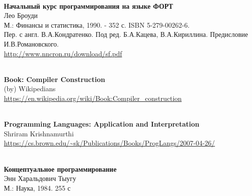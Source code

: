 \begin{thebibliography}{99}
\clearpage
{}\ \\
\textbf{Начальный курс программирования на языке ФОРТ}\\
Лео Броуди \\
М.: Финансы и статистика, 1990. - 352 с.  ISBN 5-279-00262-6.\\
Пер. с англ. В.А.Кондратенко. Под ред. Б.А.Кацева, В.А.Кириллина. Предисловие
И.В.Романовского.\\
\url{http://www.nncron.ru/download/sf.pdf}

\clearpage
{}\ \\
\textbf{Book: Compiler Construction}\\
(by) Wikipedians\\
\url{https://en.wikipedia.org/wiki/Book:Compiler_construction}

\clearpage
{}\ \\
\textbf{Programming Languages: Application and Interpretation}\\
Shriram Krishnamurthi\\
\url{https://cs.brown.edu/~sk/Publications/Books/ProgLangs/2007-04-26/}

\clearpage
{}\ \\
\textbf{Концептуальное программирование}\\
Энн Харальдович Тыугу\\
М.: Наука, 1984. 255 с

\end{thebibliography}
